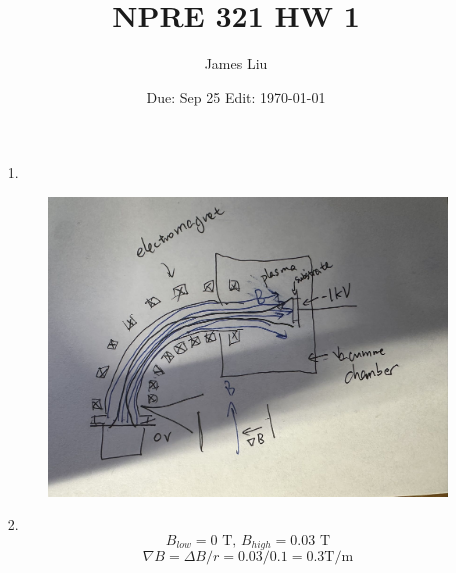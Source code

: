 \documentclass{article}
\date{Due: Sep 25 Edit: \today}
\title{NPRE 321 HW 1}
\author{James Liu}
\begin{document}
\maketitle
\begin{itemize}
    \item [1.] \ 
    \begin{figure}[h]
        \centering
        \includegraphics*[scale = 0.2]{figure/fig_231_hw3.jpeg}
    \end{figure}
    \item [2.]
    \[B_{low} = 0 \text{ T, } B_{high} = 0.03 \text{ T}\]
    \[\nabla B = \Delta B/r = 0.03/0.1 = 0.3 \text{T/m}\]
    

\end{itemize}
\end{document}

